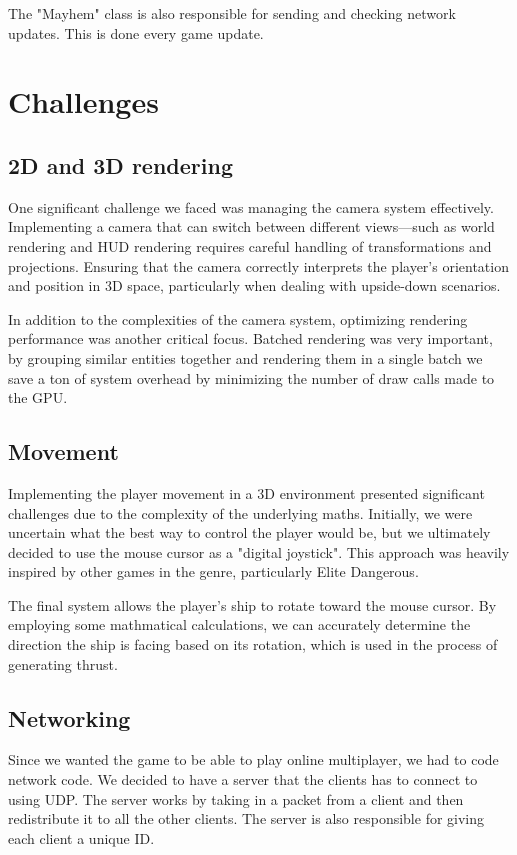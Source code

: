 \documentclass[journal]{IEEEtran}
\begin{document}
The "Mayhem" class is also responsible for sending and checking network updates. This is done every game update.
\section{Challenges}\label{Section:Challenges}
\subsection{2D and 3D rendering}
One significant challenge we faced was managing the camera system effectively. Implementing a camera that can switch between different views—such as world rendering and HUD rendering requires careful handling of transformations and projections.
Ensuring that the camera correctly interprets the player's orientation and position in 3D space, particularly when dealing with upside-down scenarios.

In addition to the complexities of the camera system, optimizing rendering performance was another critical focus. Batched rendering was very important, by grouping similar entities together and rendering them in a single batch we save a ton of system overhead by minimizing the number of draw calls made to the GPU.

\subsection{Movement}
Implementing the player movement in a 3D environment presented significant challenges due to the complexity of the underlying maths. Initially, we were uncertain what the best way to control the player would be, but we ultimately decided to use the mouse cursor as a "digital joystick". This approach was heavily inspired by other games in the genre, particularly Elite Dangerous.

The final system allows the player's ship to rotate toward the mouse cursor. By employing some mathmatical calculations, we can accurately determine the direction the ship is facing based on its rotation, which is used in the process of generating thrust.

\subsection{Networking}
Since we wanted the game to be able to play online multiplayer, we had to code network code.
We decided to have a server that the clients has to connect to using UDP. The server works by taking in a packet from a client and then redistribute it to all the other clients. The server is also responsible for giving each client a unique ID.
\end{document}
